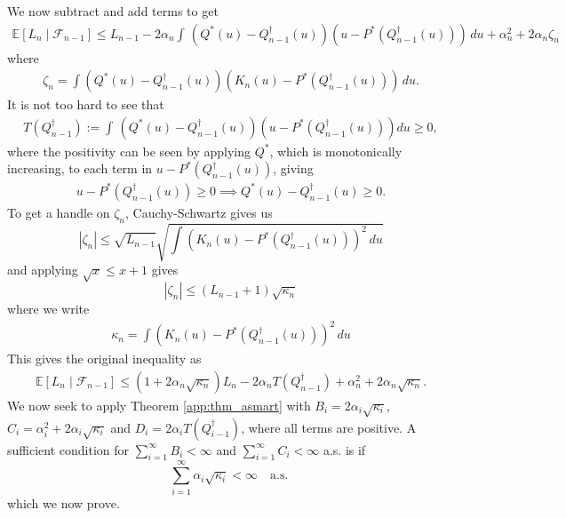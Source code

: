 \documentclass[11pt,a4paper]{article}
\newcommand{\E}{\mathbb{E}}
\begin{document}
\begin{appendices}
$$$$
We now subtract and add terms to get
\begin{align*}
   \E\left[L_{n} \mid \mathcal{F}_{n-1}\right]   \leq L_{n-1} -2\alpha_{n}\int \, (Q^*(u) - Q^\dagger_{n-1}(u))(  u - P^*( Q^\dagger_{n-1}(u)))\, du + \alpha_{n}^2 + 2\alpha_{n}\zeta_n
\end{align*}
where 
\begin{align}
    \zeta_n = \int(Q^*(u) - Q^\dagger_{n-1}(u))(  K_{n}\left(u\right)-P^*( Q^\dagger_{n-1}(u)))\, du.
\end{align}
It is not too hard to see that
\begin{align*}
    T(Q_{n-1}^{\dagger}):= \int \, (Q^*(u) - Q^\dagger_{n-1}(u))(u- P^*( Q^\dagger_{n-1}(u)))du \geq 0,
\end{align*}
where the positivity can be seen by applying $Q^*$, which is monotonically increasing, to each term in $u - P^*( Q^\dagger_{n-1}(u))$, giving
\begin{align*}
    u - P^*( Q^\dagger_{n-1}(u)) \geq 0 \implies Q^*(u) -Q^\dagger_{n-1}(u) \geq 0.
\end{align*}
To get a handle on $\zeta_n$, Cauchy-Schwartz gives us
\begin{equation*}
     |\zeta_n| \leq \sqrt{L_{n-1}}\sqrt{\int (  K_{n}\left(u\right)-P^*( Q^\dagger_{n-1}(u)))^2\, du}
\end{equation*}
and applying $\sqrt{x} \leq x + 1$ gives
\begin{equation*}
     |\zeta_n| \leq (L_{n-1} + 1)\sqrt{\kappa_n}
\end{equation*}
where we write 
\begin{align}\label{app:eq_kappan}
    \kappa_n = {\int(  K_{n}\left(u\right)-P^*( Q^\dagger_{n-1}(u)))^2\, du}
\end{align} 
This gives the original inequality as 
\begin{align*}
   \E[L_{n} \mid \mathcal{F}_{n-1}] \leq \left(1 + 2\alpha_{n}\sqrt{\kappa_n}\right)L_n-2\alpha_{n}T(Q_{n-1}^{\dagger}) + \alpha_{n}^2 + 2\alpha_{n}\sqrt{\kappa_n}.
\end{align*}
We now seek to apply {Theorem \ref{app:thm_asmart}} with $B_i = 2\alpha_i \sqrt{\kappa_i}$, $C_i =\alpha_{i}^2 + 2\alpha_{i}\sqrt{\kappa_i}$ and $D_i =2\alpha_{i}T(Q_{i-1}^{\dagger})$, where all terms are positive.
A sufficient condition for $\sum_{i = 1}^\infty B_i < \infty$ and $\sum_{i = 1}^\infty C_i < \infty$ a.s. is if 
$$\sum_{i=1}^\infty \alpha_{i}\sqrt{\kappa_i} < \infty \quad \text{a.s. }$$
which we now prove.


\end{appendices}
\end{document}

